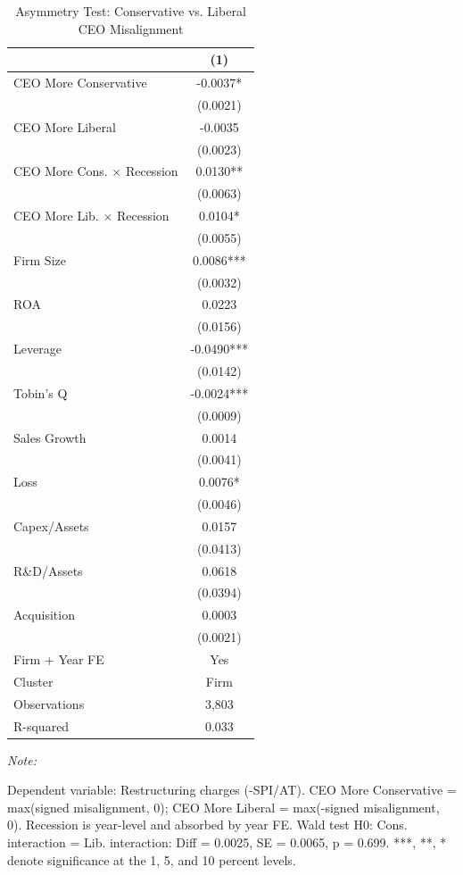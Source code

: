 \documentclass[
  10pt,
]{article}
\begin{document}
\begin{table}[!h]
\centering
\caption{\label{tab:table7}Asymmetry Test: Conservative vs. Liberal CEO Misalignment}
\centering
\fontsize{9}{11}\selectfont
\begin{threeparttable}
\begin{tabular}[t]{lc}
\toprule
 & (1)\\
\midrule
CEO More Conservative & -0.0037*\\
 & \vphantom{1} (0.0021)\\
CEO More Liberal & -0.0035\\
 & (0.0023)\\
CEO More Cons. × Recession & 0.0130**\\
\addlinespace
 & (0.0063)\\
CEO More Lib. × Recession & 0.0104*\\
 & (0.0055)\\
Firm Size & 0.0086***\\
 & (0.0032)\\
\addlinespace
ROA & 0.0223\\
 & (0.0156)\\
Leverage & -0.0490***\\
 & (0.0142)\\
Tobin's Q & -0.0024***\\
\addlinespace
 & (0.0009)\\
Sales Growth & 0.0014\\
 & (0.0041)\\
Loss & 0.0076*\\
 & (0.0046)\\
\addlinespace
Capex/Assets & 0.0157\\
 & (0.0413)\\
R\&D/Assets & 0.0618\\
 & (0.0394)\\
Acquisition & 0.0003\\
\addlinespace
 & (0.0021)\\
\midrule
Firm + Year FE & Yes\\
Cluster & Firm\\
Observations & 3,803\\
R-squared & 0.033\\
\bottomrule
\end{tabular}
\begin{tablenotes}[para]
\item \textit{Note: } 
\item Dependent variable: Restructuring charges (-SPI/AT). CEO More Conservative = max(signed misalignment, 0); CEO More Liberal = max(-signed misalignment, 0). Recession is year-level and absorbed by year FE. Wald test H0: Cons. interaction = Lib. interaction: Diff = 0.0025, SE = 0.0065, p = 0.699. ***, **, * denote significance at the 1, 5, and 10 percent levels.
\end{tablenotes}
\end{threeparttable}
\end{table}
\end{document}
